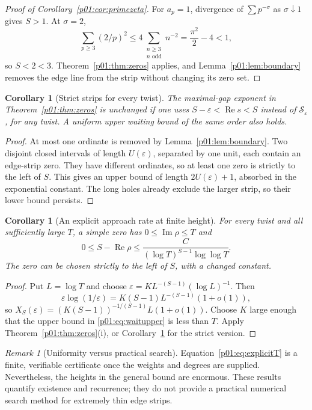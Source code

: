 \documentclass[11pt,letterpaper]{article}
\newtheorem{corollary}[theorem]{Corollary}
\theoremstyle{definition}
\theoremstyle{remark}
\newtheorem{remark}[theorem]{Remark}
\newcommand{\eps}{\varepsilon}
\newcommand{\Ree}{\operatorname{Re}}
\newcommand{\Imm}{\operatorname{Im}}
\newcommand{\1}{\mathbf 1}
\begin{document}
\begin{proof}[Proof of Corollary~\ref{p01:cor:primezeta}]
For $a_p=1$, divergence of $\sum p^{-\sigma}$ as $\sigma\downarrow1$
gives $S>1$. At $\sigma=2$,
\[
 \sum_{p\ge3}(2/p)^2
 \le4\sum_{\substack{n\ge3\\n\text{ odd}}}n^{-2}
 =\frac{\pi^2}{2}-4<1,
\]
so $S<2<3$. Theorem~\ref{p01:thm:zeros} applies, and
Lemma~\ref{p01:lem:boundary} removes the edge line from the strip without
changing its zero set.
\end{proof}

\begin{corollary}[Strict strips for every twist]\label{p01:cor:strict}
The maximal-gap exponent in Theorem~\ref{p01:thm:zeros} is unchanged if
one uses $S-\eps<\Ree s<S$ instead of $\mathcal S_\eps$, for any
twist. A uniform upper waiting bound of the same order also holds.
\end{corollary}
\begin{proof}
At most one ordinate is removed by Lemma~\ref{p01:lem:boundary}. Two
disjoint closed intervals of length $U(\eps)$, separated by one unit,
each contain an edge-strip zero. They have different ordinates, so at
least one zero is strictly to the left of $S$. This gives an upper
bound of length $2U(\eps)+1$, absorbed in the exponential constant.
The long holes already exclude the larger strip, so their lower
bound persists.
\end{proof}

\begin{corollary}[An explicit approach rate at finite height]\label{p01:cor:approach}
For every twist and all sufficiently large $T$, a simple zero has
$0\le\Imm\rho\le T$ and
\begin{equation}\label{p01:eq:approach}
 0\le S-\Ree\rho
 \le\frac{C}{(\log T)^{S-1}\log\log T}.
\end{equation}
The zero can be chosen strictly to the left of $S$, with a changed
constant.
\end{corollary}
\begin{proof}
Put $L=\log T$ and choose
$\eps=K L^{-(S-1)}(\log L)^{-1}$.
Then
\[
 \eps\log(1/\eps)
 =K(S-1)L^{-(S-1)}(1+o(1)),
\]
so $X_S(\eps)=(K(S-1))^{-1/(S-1)}L(1+o(1))$.
Choose $K$ large enough that the upper bound in
\eqref{p01:eq:waitupper} is less than $T$. Apply
Theorem~\ref{p01:thm:zeros}(i), or Corollary~\ref{p01:cor:strict} for the
strict version.
\end{proof}

\begin{remark}[Uniformity versus practical search]
Equation~\eqref{p01:eq:explicitT} is a finite, verifiable certificate once
the weights and degrees are supplied. Nevertheless, the heights in the
general bound are enormous. These results quantify existence and
recurrence; they do not provide a practical numerical search method
for extremely thin edge strips.
\end{remark}
\end{document}
